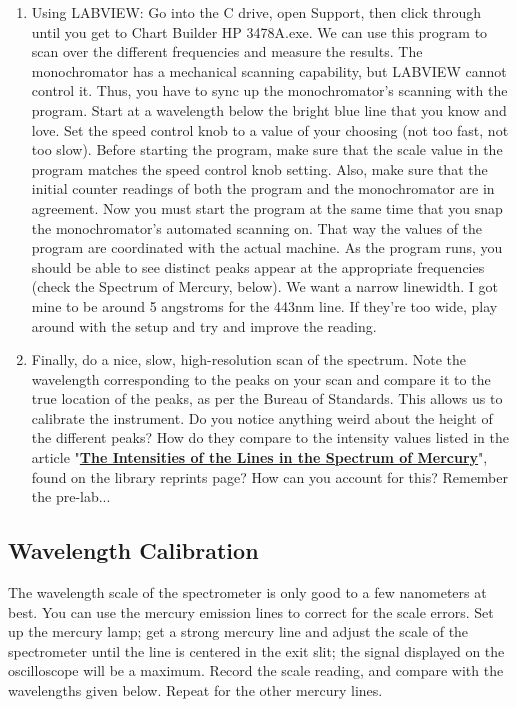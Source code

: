 \documentclass{../lab}
\begin{document}
\begin{enumerate}
    \item Using LABVIEW:
    Go into the C drive, open Support, then click through until you get to Chart Builder HP 3478A.exe. We can use this program to scan over the different frequencies and measure the results. The monochromator has a mechanical scanning capability, but LABVIEW cannot control it. Thus, you have to sync up the monochromator's scanning with the program. Start at a wavelength below the bright blue line that you know and love. Set the speed control knob to a value of your choosing (not too fast, not too slow). Before starting the program, make sure that the scale value in the program matches the speed control knob setting. Also, make sure that the initial counter readings of both the program and the monochromator are in agreement. Now you must start the program at the same time that you snap the monochromator's automated scanning on. That way the values of the program are coordinated with the actual machine. As the program runs, you should be able to see distinct peaks appear at the appropriate frequencies (check the Spectrum of Mercury, below). We want a narrow linewidth. I got mine to be around 5 angstroms for the 443nm line. If they're too wide, play around with the setup and try and improve the reading.
    
    \item Finally, do a nice, slow, high-resolution scan of the spectrum. Note the wavelength corresponding to the peaks on your scan and compare it to the true location of the peaks, as per the Bureau of Standards. This allows us to calibrate the instrument. Do you notice anything weird about the height of the different peaks? How do they compare to the intensity values listed in the article "\href{http://physics111.lib.berkeley.edu/Physics111/Reprints/ATM/ATM\%20Yellow\%20lines_p593_1.pdf}{\textbf{The Intensities of the Lines in the Spectrum of Mercury}}", found on the library reprints page? How can you account for this? Remember the pre-lab...
\end{enumerate}

\subsection{Wavelength Calibration}

The wavelength scale of the spectrometer is only good to a few nanometers at best. You can use the mercury emission lines to correct for the scale errors. Set up the mercury lamp; get a strong mercury line and adjust the scale of the spectrometer until the line is centered in the exit slit; the signal displayed on the oscilloscope will be a maximum. Record the scale reading, and compare with the wavelengths given below. Repeat for the other mercury lines.
\end{document}
